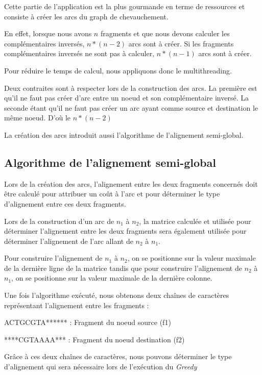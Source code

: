\documentclass[12pt,a4paper,final]{article}
\begin{document}
Cette partie de l'application est la plus gourmande en terme de ressources et consiste à créer les arcs du graph de chevauchement.\medskip

En effet, lorsque nous avons $n$ fragments et que nous devons calculer les complémentaires inversés, $n*(n-2)$ arcs sont à créer.  Si les fragments complémentaires inversés ne sont pas à calculer, $n*(n-1)$ arcs sont à créer.\medskip

Pour réduire le temps de calcul, nous appliquons donc le multithreading.\medskip

Deux contraites sont à respecter lors de la construction des arcs.  La première est qu'il ne faut pas créer d'arc entre un noeud et son complémentaire inversé.  La seconde étant qu'il ne faut pas créer un arc ayant comme source et destination le même noeud.  D'où le $n*(n-2)$\medskip

La création des arcs introduit aussi l'algorithme de l'alignement semi-global.\medskip

\subsection{Algorithme de l'alignement semi-global}

Lors de la création des arcs, l'alignement entre les deux fragments concernés doit être calculé pour attribuer un coût à l'arc et pour déterminer le type d'alignement entre ces deux fragments.\medskip

Lors de la construction d'un arc de $n_1$ à $n_2$, la matrice calculée et utilisée pour déterminer l'alignement entre les deux fragments sera également utilisée pour déterminer l'alignement de l'arc allant de $n_2$ à $n_1$.\medskip

Pour construire l'alignement de $n_1$ à $n_2$, on se positionne sur la valeur maximale de la dernière ligne de la matrice tandis que pour construire l'alignement de $n_2$ à $n_1$, on se positionne sur la valeur maximale de la dernière colonne.\medskip

Une fois l'algorithme exécuté, nous obtenons deux chaînes de caractères représentant l'alignement entre les fragments : \medskip

ACTGCGTA****** : Fragment du noeud source (f1)\medskip

****CGTAAAA*** : Fragment du noeud destination (f2) \medskip


Grâce à ces deux chaînes de caractères, nous pouvons déterminer le type d'alignement qui sera nécessaire lors de l'exécution du \textit{Greedy}\medskip
\end{document}
